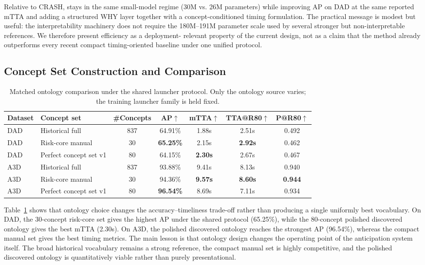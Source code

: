 Relative to CRASH, \method{} stays in the same small-model regime (30M vs. 26M
parameters) while improving AP on DAD at the same reported mTTA and adding a
structured WHY layer together with a concept-conditioned timing formulation.
The practical message is modest but useful: the interpretability machinery does
not require the 180M--191M parameter scale used by several stronger but
non-interpretable references. We therefore present efficiency as a deployment-
relevant property of the current design, not as a claim that the method already
outperforms every recent compact timing-oriented baseline under one unified
protocol.

\subsection{Concept Set Construction and Comparison}

\begin{table}[t]
\caption{Matched ontology comparison under the shared launcher protocol. Only the ontology source varies; the training launcher family is held fixed.}
\label{tab:concept_sets}
\centering\small
\begin{tabular}{llccccc}
\toprule
Dataset & Concept set & \#Concepts & AP$\uparrow$ & mTTA$\uparrow$ & TTA@R80$\uparrow$ & P@R80$\uparrow$\\
\midrule
DAD & Historical full & 837 & 64.91\% & 1.88s & 2.51s & 0.492 \\
DAD & Risk-core manual & 30 & \textbf{65.25\%} & 2.15s & \textbf{2.92s} & 0.462 \\
DAD & Perfect concept set v1 & 80 & 64.15\% & \textbf{2.30s} & 2.67s & 0.467 \\
\midrule
A3D & Historical full & 837 & 93.88\% & 9.41s & 8.13s & 0.940 \\
A3D & Risk-core manual & 30 & 94.36\% & \textbf{9.57s} & \textbf{8.60s} & \textbf{0.944} \\
A3D & Perfect concept set v1 & 80 & \textbf{96.54\%} & 8.69s & 7.11s & 0.934 \\
\bottomrule
\end{tabular}
\end{table}

Table~\ref{tab:concept_sets} shows that ontology choice changes the
accuracy--timeliness trade-off rather than producing a single uniformly best
vocabulary. On DAD, the 30-concept risk-core set gives the highest AP under the
shared protocol (65.25\%), while the 80-concept polished discovered ontology
gives the best mTTA (2.30s). On A3D, the polished discovered ontology reaches
the strongest AP (96.54\%), whereas the compact manual set gives the best
timing metrics. The main lesson is that ontology design changes the operating
point of the anticipation system itself. The broad historical vocabulary
remains a strong reference, the compact manual set is highly competitive, and
the polished discovered ontology is quantitatively viable rather than purely
presentational.

